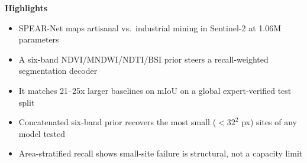 \documentclass{article}
\begin{document}
\noindent\textbf{Highlights}
\begin{itemize}[leftmargin=1.2em,itemsep=2pt]
  \item SPEAR-Net maps artisanal vs.\ industrial mining in Sentinel-2 at 1.06M parameters
  \item A six-band NDVI/MNDWI/NDTI/BSI prior steers a recall-weighted segmentation decoder
  \item It matches 21--25x larger baselines on mIoU on a global expert-verified test split
  \item Concatenated six-band prior recovers the most small ($<32^2$ px) sites of any model tested
  \item Area-stratified recall shows small-site failure is structural, not a capacity limit
\end{itemize}
\end{document}
